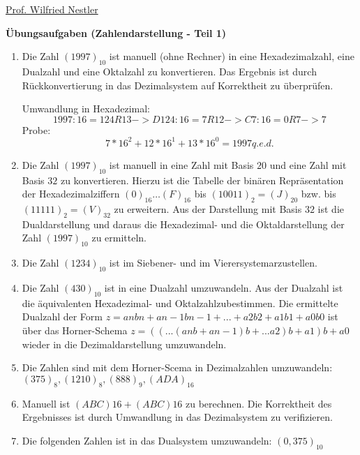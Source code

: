 \documentclass[12pt,a4paper]{scrreprt}
\begin{document}
\begin{flushleft}%
\href{mailto:nestler@informatik.htw-dresden.de}{Prof. Wilfried Nestler}
\end{flushleft}

\large\textbf{Übungsaufgaben (Zahlendarstellung - Teil 1)}

\begin{enumerate}

\item Die Zahl $(1997)_10$ ist manuell (ohne Rechner) in eine Hexadezimalzahl, eine Dualzahl und eine Oktalzahl zu konvertieren. Das Ergebnis ist durch Rückkonvertierung in das Dezimalsystem auf Korrektheit zu überprüfen.

Umwandlung in Hexadezimal:
\[
    1997 : 16 = 124 R 13 -> D
     124 : 16 =   7 R 12 -> C
       7 : 16 =   0 R  7 -> 7
\]
Probe:
\[
    7*16^2 + 12*16^1 + 13*16^0 = 1997 q.e.d.
\]
\item Die Zahl $(1997)_10$ ist manuell in eine Zahl mit Basis $20$ und eine Zahl mit Basis $32$ zu konvertieren. Hierzu ist die Tabelle der binären Repräsentation der Hexadezimalziffern $(0)_16 \ldots (F)_16$ bis $(10011)_2 = (J)_20$ bzw. bis $(11111)_2 = (V)_32$ zu erweitern. Aus der Darstellung mit Basis $32$ ist die Dualdarstellung und daraus die Hexadezimal- und die Oktaldarstellung der Zahl $(1997)_10$ zu ermitteln.

\item Die Zahl $(1234)_10$ ist im Siebener- und im Vierersystemarzustellen.

\item Die Zahl $(430)_10$ ist in eine Dualzahl umzuwandeln. Aus der Dualzahl ist die äquivalenten Hexadezimal- und Oktalzahlzubestimmen. Die ermittelte Dualzahl der Form $z=a n b n +a n-1 b n - 1 + ... +a 2 b 2 +a 1 b 1 + a 0 b 0$ ist über das Horner-Schema $z = ((...(a n b+a n-1 )b+ ... a 2 ) b +a 1 ) b +a 0$ wieder in die Dezimaldarstellung umzuwandeln.

\item Die Zahlen sind mit dem Horner-Scema in Dezimalzahlen umzuwandeln: $(375)_8 , (1210)_8 , (888)_9 , (ADA)_16$

\item Manuell ist $(ABC) 16 + (ABC) 16$ zu berechnen. Die Korrektheit des Ergebnisses ist durch Umwandlung in das Dezimalsystem zu verifizieren.

\item Die folgenden Zahlen ist in das Dualsystem umzuwandeln: $(0,375)_10$


\end{enumerate}
\end{document}
